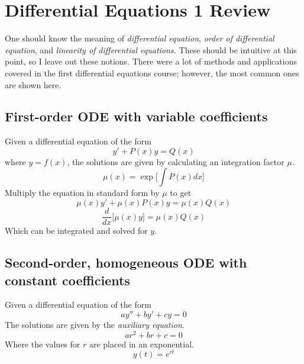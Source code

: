 \chapter{Differential Equations 1 Review}
One should know the meaning of \emph{differential equation}, \emph{order of differential equation}, and \emph{linearity of differential equations.} These should be intuitive at this point, so I leave out these notions. There were a lot of methods and applications covered in the first differential equations course; however, the most common ones are shown here.


\section{First-order ODE with variable coefficients}
Given a differential equation of the form
\begin{equation}
    y' + P(x) y = Q(x)
\end{equation}
where $y=f(x)$, the solutions are given by calculating an integration factor $\mu$.
\begin{equation}
    \mu(x) = \exp\Big[ \int P(x) dx \Big]
\end{equation}
Multiply the equation in standard form by $\mu$ to get
\begin{equation*}
    \mu(x) y' + \mu(x) P(x) y = \mu(x) Q(x)
\end{equation*}
\begin{equation}
    \frac{d}{dx} \Big[\mu(x) y \Big] = \mu(x) Q(x)
\end{equation}
Which can be integrated and solved for $y$.


\section{Second-order, homogeneous ODE with constant coefficients} \label{sec:constcoef}
Given a differential equation of the form
\begin{equation} \label{eq:homo-const}
    a y'' + b y' + c y = 0
\end{equation}
The solutions are given by the \emph{auxiliary equation}.
\begin{equation}
    a r^2 + b r + c = 0
\end{equation}
Where the values for $r$ are placed in an exponential.
\begin{equation}
    y(t) = e^{rt}
\end{equation}


